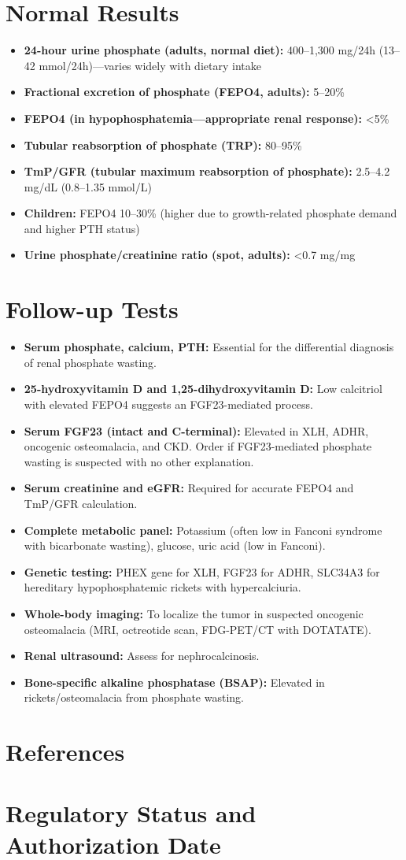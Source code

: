 \section*{Normal Results}
\begin{itemize}
  \item \textbf{24-hour urine phosphate (adults, normal diet):} 400--1,300 mg/24h (13--42 mmol/24h)---varies widely with dietary intake
  \item \textbf{Fractional excretion of phosphate (FEPO4, adults):} 5--20\%
  \item \textbf{FEPO4 (in hypophosphatemia---appropriate renal response):} <5\%
  \item \textbf{Tubular reabsorption of phosphate (TRP):} 80--95\%
  \item \textbf{TmP/GFR (tubular maximum reabsorption of phosphate):} 2.5--4.2 mg/dL (0.8--1.35 mmol/L)
  \item \textbf{Children:} FEPO4 10--30\% (higher due to growth-related phosphate demand and higher PTH status)
  \item \textbf{Urine phosphate/creatinine ratio (spot, adults):} <0.7 mg/mg
\end{itemize}

\section*{Follow-up Tests}
\begin{itemize}
  \item \textbf{Serum phosphate, calcium, PTH:} Essential for the differential diagnosis of renal phosphate wasting.
  \item \textbf{25-hydroxyvitamin D and 1,25-dihydroxyvitamin D:} Low calcitriol with elevated FEPO4 suggests an FGF23-mediated process.
  \item \textbf{Serum FGF23 (intact and C-terminal):} Elevated in XLH, ADHR, oncogenic osteomalacia, and CKD. Order if FGF23-mediated phosphate wasting is suspected with no other explanation.
  \item \textbf{Serum creatinine and eGFR:} Required for accurate FEPO4 and TmP/GFR calculation.
  \item \textbf{Complete metabolic panel:} Potassium (often low in Fanconi syndrome with bicarbonate wasting), glucose, uric acid (low in Fanconi).
  \item \textbf{Genetic testing:} PHEX gene for XLH, FGF23 for ADHR, SLC34A3 for hereditary hypophosphatemic rickets with hypercalciuria.
  \item \textbf{Whole-body imaging:} To localize the tumor in suspected oncogenic osteomalacia (MRI, octreotide scan, FDG-PET/CT with DOTATATE).
  \item \textbf{Renal ultrasound:} Assess for nephrocalcinosis.
  \item \textbf{Bone-specific alkaline phosphatase (BSAP):} Elevated in rickets/osteomalacia from phosphate wasting.
\end{itemize}

\section*{References}



\clearpage
\section*{Regulatory Status and Authorization Date}

\clearpage

